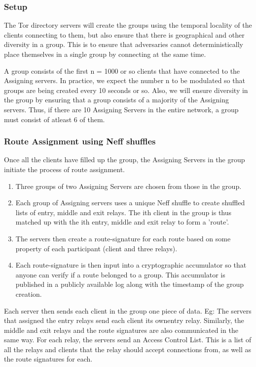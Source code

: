 \subsubsection{Setup}
The Tor directory servers will create the groups using the temporal locality of the clients connecting to them, but also ensure that there is geographical and other diversity in a group. This is to ensure that adversaries cannot deterministically place themselves in a single group by connecting at the same time.

A group consists of the first n = 1000 or so clients that have connected to the Assigning servers. In practice, we expect the number n to be modulated so that groups are being created every 10 seconds or so. Also, we will ensure diversity in the group by ensuring that a group consists of a majority of the Assigning servers. Thus, if there are 10 Assigning Servers in the entire network, a group must consist of atleast 6 of them.


\subsubsection{Route Assignment using Neff shuffles}
Once all the clients have filled up the group, the Assigning Servers in the group initiate the process of route assignment.
\begin{enumerate}
  \item Three groups of two Assigning Servers are chosen from those in the group.
  \item Each group of Assigning servers uses a unique Neff shuffle to create shuffled lists of entry, middle and exit relays. The ith client in the group is thus matched up with the ith entry, middle and exit relay to form a 'route'.
  \item The servers then create a route-signature for each route based on some property of each participant (client and three relays).
  \item Each route-signature is then input into a cryptographic accumulator so that anyone can verify if a route belonged to a group. This accumulator is published in a publicly available log along with the timestamp of the group creation.
\end{enumerate}

Each server then sends each client in the group one piece of data. Eg: The servers that assigned the entry relays send each client its ownentry relay. Similarly, the middle and exit relays and the route signatures are also communicated in the same way. 
For each relay, the servers send an Access Control List. This is a list of all the relays and clients that the relay should accept connections from, as well as the route signatures for each.

